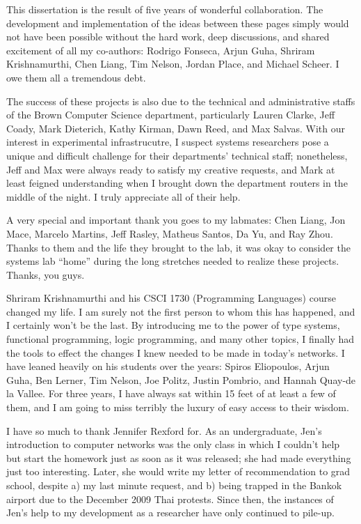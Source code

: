 

This dissertation is the result of five years of wonderful collaboration.
The development and implementation of the ideas between these pages simply
would not have been possible without the hard work, deep discussions, and
shared excitement of all my co-authors: Rodrigo Fonseca, Arjun Guha,
Shriram Krishnamurthi, Chen Liang, Tim Nelson, Jordan Place, and Michael
Scheer. I owe them all a tremendous debt.

The success of these projects is also due to the technical and administrative
staffs of the Brown Computer Science department, particularly Lauren
Clarke, Jeff Coady, Mark Dieterich, Kathy Kirman, Dawn Reed, and Max Salvas.
With our interest in experimental infrastrucutre, I suspect systems researchers
pose a unique and difficult challenge for their departments' technical staff;
nonetheless, Jeff and Max were always ready to satisfy my creative requests,
and Mark at least feigned understanding when I brought down the department
routers in the middle of the night. I truly appreciate all of their help.

A very special and important thank you goes to my labmates:
Chen Liang, Jon Mace, Marcelo Martins, Jeff Rasley, Matheus Santos, Da Yu,
and Ray Zhou. Thanks to them and the life they brought to the lab, it was
okay to consider the systems lab ``home'' during the long stretches needed to
realize these projects. Thanks, you guys.

Shriram Krishnamurthi and his CSCI 1730 (Programming Languages) course
changed my life. I am surely not the first person to whom this has happened,
and I certainly won't be the last. By introducing me to the power of
type systems, functional programming, logic programming, and many other
topics, I finally had the tools to effect the changes I knew needed to
be made in today's networks. I have leaned heavily on his students over
the years: Spiros Eliopoulos, Arjun Guha, Ben Lerner, Tim Nelson, Joe Politz,
Justin Pombrio, and Hannah Quay-de la Vallee. For three years, I have always
sat within 15 feet of at least a few of them, and I am going to miss
terribly the luxury of easy access to their wisdom.

I have so much to thank Jennifer Rexford for. As an undergraduate, Jen's
introduction to computer networks was the only class in which I couldn't help
but start the homework just as soon as it was released; she had made everything
just too interesting. Later, she would write my letter of recommendation to
grad school, despite a) my last minute request, and b) being trapped in the
Bankok airport due to the December 2009 Thai protests. Since then, the instances 
of Jen's help to my development as a researcher have only continued to pile-up.

